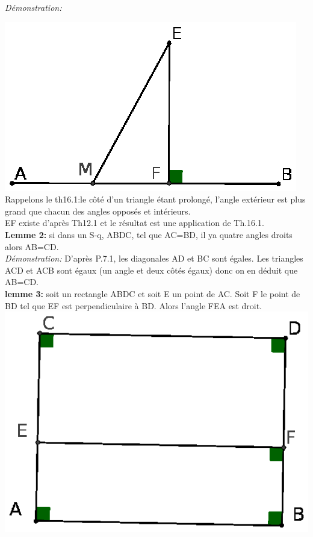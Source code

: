 \documentclass[a4paper, 12pt, twoside]{book}
\begin{document}
\textit{Démonstration:} \

\includegraphics[scale=0.7]{figures/saccheri1.eps} \\

Rappelons le th16.1:le côté d'un triangle étant prolongé, l'angle extérieur est plus grand que chacun des angles opposés et intérieurs.\\

EF existe d'après Th12.1 et le résultat est une application de Th.16.1.\\

\textbf{Lemme 2:} si dans un S-q, ABDC, tel que AC=BD, il ya quatre angles droits alors AB=CD.\\

\textit{Démonstration:} D'après P.7.1, les diagonales AD et BC sont égales. Les  triangles ACD et ACB  sont égaux (un angle et deux côtés égaux) donc on en déduit que AB=CD.\\

\textbf{lemme 3:} soit un rectangle ABDC et soit E un point de AC. Soit F le point de BD tel que EF est perpendiculaire à BD. Alors l'angle FEA est droit.\\

 \includegraphics[scale=0.7]{figures/saccheri2.eps} \\
\end{document}

